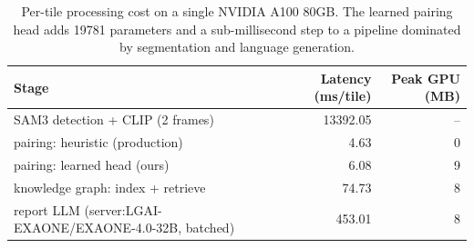 \begin{table}[t]
\centering
\caption{Per-tile processing cost on a single NVIDIA A100 80GB. The learned pairing head adds 19781 parameters and a sub-millisecond step to a pipeline dominated by segmentation and language generation.}
\label{tab:efficiency}
\begin{tabular}{lrr}
\toprule
Stage & Latency (ms/tile) & Peak GPU (MB) \\
\midrule
SAM3 detection + CLIP (2 frames) & 13392.05 & -- \\
pairing: heuristic (production) & 4.63 & 0 \\
pairing: learned head (ours) & 6.08 & 9 \\
knowledge graph: index + retrieve & 74.73 & 8 \\
report LLM (server:LGAI-EXAONE/EXAONE-4.0-32B, batched) & 453.01 & 8 \\
\bottomrule
\end{tabular}
\end{table}
